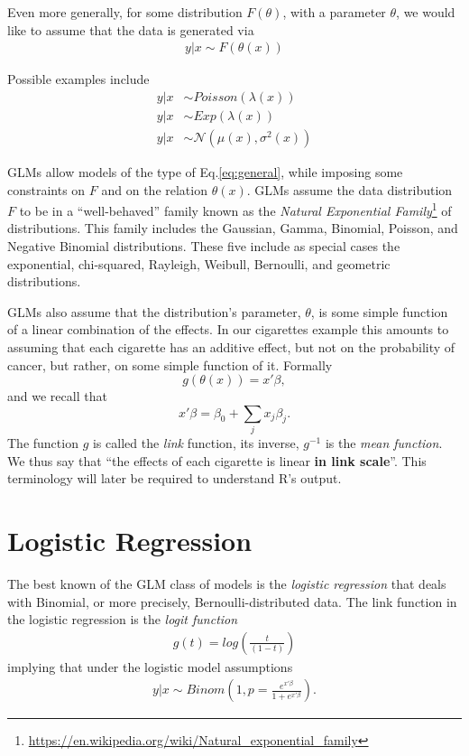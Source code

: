 \documentclass[]{book}
\renewcommand{\href}[2]{#2\footnote{\url{#1}}}
\theoremstyle{definition}
\theoremstyle{definition}
\theoremstyle{definition}
\theoremstyle{remark}
\begin{document}
Even more generally, for some distribution \(F(\theta)\), with a parameter \(\theta\), we would like to assume that the data is generated via
\begin{align}
  \label{eq:general}
  y|x \sim F(\theta(x))
\end{align}

Possible examples include
\begin{align}
 y|x &\sim Poisson(\lambda(x)) \\
 y|x &\sim Exp(\lambda(x)) \\
 y|x &\sim \mathcal{N}(\mu(x),\sigma^2(x)) 
\end{align}

GLMs allow models of the type of Eq.\eqref{eq:general}, while imposing some constraints on \(F\) and on the relation \(\theta(x)\).
GLMs assume the data distribution \(F\) to be in a ``well-behaved'' family known as the \href{https://en.wikipedia.org/wiki/Natural_exponential_family}{\emph{Natural Exponential Family}} of distributions.
This family includes the Gaussian, Gamma, Binomial, Poisson, and Negative Binomial distributions.
These five include as special cases the exponential, chi-squared, Rayleigh, Weibull, Bernoulli, and geometric distributions.

GLMs also assume that the distribution's parameter, \(\theta\), is some simple function of a linear combination of the effects.
In our cigarettes example this amounts to assuming that each cigarette has an additive effect, but not on the probability of cancer, but rather, on some simple function of it.
Formally
\[g(\theta(x))=x'\beta,\] and we recall that \[x'\beta=\beta_0 + \sum_j x_j \beta_j.\]
The function \(g\) is called the \emph{link} function, its inverse, \(g^{-1}\) is the \emph{mean function}.
We thus say that ``the effects of each cigarette is linear \textbf{in link scale}''.
This terminology will later be required to understand R's output.

\hypertarget{logistic-regression}{%
\section{Logistic Regression}\label{logistic-regression}}

The best known of the GLM class of models is the \emph{logistic regression} that deals with Binomial, or more precisely, Bernoulli-distributed data.
The link function in the logistic regression is the \emph{logit function}
\begin{align}
  g(t)=log\left( \frac{t}{(1-t)} \right)
  \label{eq:logistic-link}  
\end{align}
implying that under the logistic model assumptions
\begin{align}
  y|x \sim Binom \left( 1, p=\frac{e^{x'\beta}}{1+e^{x'\beta}} \right).
  \label{eq:logistic}
\end{align}
\end{document}
